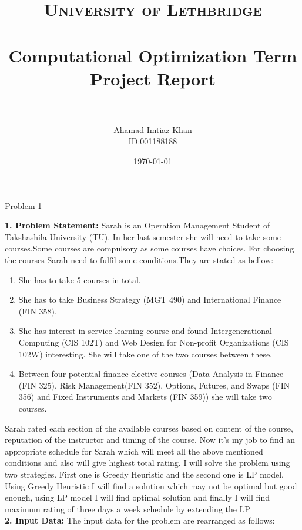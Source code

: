 \documentclass[paper=letter, fontsize=11pt]{scrartcl} %
\title{	
\normalfont \normalsize 
\textsc{University of Lethbridge} \\ [25pt] %
\horrule{0.5pt} \\[0.4cm] %
\huge Computational Optimization Term Project Report\\ %
\horrule{2pt} \\[0.5cm] %
}
\author{Ahamad Imtiaz Khan\\ID:001188188} %
\date{\normalsize\today} %
\begin{document}
\maketitle %

\begin{center}
\LARGE Problem 1
\end{center}

\Large \textbf{1. Problem Statement:}
\normalsize Sarah is an Operation Management Student of Takshashila University (TU). In her 
last semester she will need to take some courses.Some courses are compulsory as some courses have choices.
For choosing the courses Sarah need to fulfil some conditions.They are stated as bellow:
    
\begin{enumerate}
\item She has to take 5 courses in total.
\item She has to take Business Strategy (MGT 490) and International Finance (FIN 358).
\item She has interest in service-learning course and found Intergenerational Computing (CIS 102T) and Web Design for Non-profit Organizations (CIS 102W) interesting. She will take one of the two courses 
between these.
\item Between four potential finance elective courses (Data Analysis in Finance (FIN 325),
 Risk Management(FIN 352), Options, Futures, and Swaps (FIN 356) and 
Fixed Instruments and Markets (FIN 359)) she will take two courses.
\end{enumerate}

Sarah rated each section of the available courses based on content of the course, reputation of the instructor and timing of the course. Now it's my job to find an appropriate schedule for Sarah which will meet all the above mentioned conditions and also will give highest total rating. I will solve the problem using two strategies. First one is Greedy Heuristic and the second one is LP model. Using Greedy Heuristic I will find a solution which may not be optimal but good enough, using LP model I will find optimal solution and finally I will find maximum rating of three days a week schedule by extending the LP   
\\

\Large \textbf{2. Input Data:}
\normalsize The input data for the problem are rearranged as follows: 
\end{document}
